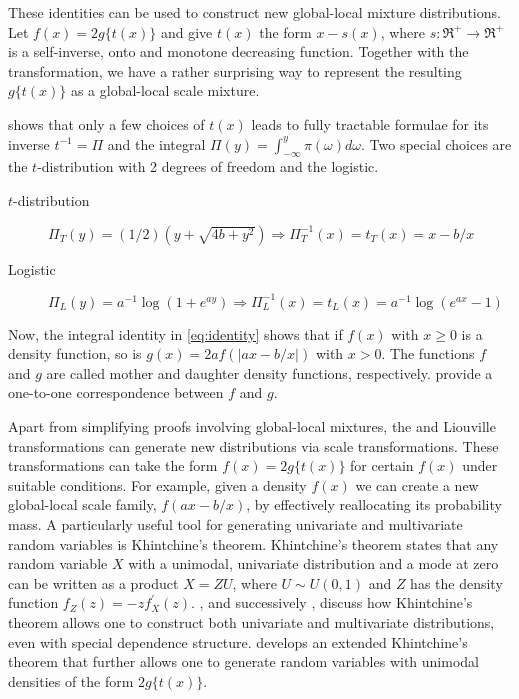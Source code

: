 \documentclass[lineno]{biometrika}
\begin{document}
These identities can be used to construct new global-local mixture distributions. 
Let $f(x) = 2g\{ t(x) \}$ and give $t(x)$ the form $x-s(x)$, where 
$s : \Re^+ \to \Re^+$ is a self-inverse, onto and monotone decreasing function. 
Together with the \CS{} transformation, we have a rather surprising way to
represent the resulting $g\{t(x)\}$ as a global-local scale mixture. 

\citet{jones_generating_2014} shows that only a few choices of $t(x)$ leads to fully tractable formulae for its inverse $t^{-1}= \Pi$ and the integral $\Pi(y) = \int_{-\infty}^{y} \pi(\omega) d\omega$. Two special choices are the $t$-distribution with 2 degrees of freedom and the logistic. 
\begin{description}
  \item[$t$-distribution] 
    $\Pi_{T}(y) = (1/2)(y+\sqrt{4b+y^2}) \Rightarrow \Pi_T^{-1}(x) = t_T(x) = x - b/x$ 
  \\
  \item[Logistic] 
    $\Pi_{L}(y) = a^{-1} \log(1+e^{ay}) \Rightarrow \Pi_L^{-1}(x) = t_L(x) = a^{-1} \log(e^{ax}-1)$
\end{description}

Now, the integral identity in \eqref{eq:identity} shows that if $f(x)$ with $x
\geq 0$ is a density function, so is $g(x) = 2a f(|ax-b/x|)$ with $x > 0$.  The
functions $f$ and $g$ are called mother and daughter
density functions, respectively.  \citet{chaubey2010reciprocal} provide a
one-to-one correspondence between $f$ and $g$. 

Apart from simplifying proofs involving global-local mixtures, the \CS{} and Liouville
transformations can generate new distributions via scale transformations.  
These transformations can take the form $f(x) = 2 g\{ t(x) \}$ 
for certain $f(x)$ under suitable conditions.  
For example, given a density $f(x)$ we can create a new global-local
scale family, $f(a x - b/x)$, by effectively reallocating its probability mass.
A particularly useful tool for generating univariate and multivariate random
variables is Khintchine's theorem.  
Khintchine's theorem states that any random variable $X$ with a unimodal,
univariate distribution and a mode at zero can be written as a product 
$X = Z U$, where $U \sim U(0,1)$ and $Z$ has the density function 
$f_Z(z) = -z f^{\prime}_{X}(z)$.
\citet{bryson1982constructing}, and successively \citet{jones2012khintchine},
discuss how Khintchine's theorem allows one to construct both univariate and
multivariate distributions, even with special dependence structure.
\cite{jones_generating_2014} develops an extended Khintchine's theorem that
further allows one to generate random variables with unimodal densities of the
form $2 g\{t(x)\}$. 
\end{document}
